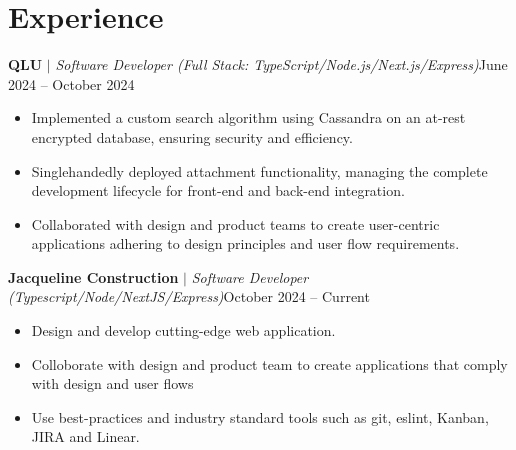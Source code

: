 
\section{Experience}
  \resumeSubHeadingListStart
          \resumeProjectHeading
          {\textbf{QLU}\vspace{8pt} $|$ \footnotesize\emph{Software Developer (Full Stack: TypeScript/Node.js/Next.js/Express)}}{June 2024 -- October 2024}
          \begin{itemize}
            \item Implemented a custom search algorithm using Cassandra on an at-rest encrypted database, ensuring security and efficiency.
            \item Singlehandedly deployed attachment functionality, managing the complete development lifecycle for front-end and back-end integration.
            \item Collaborated with design and product teams to create user-centric applications adhering to design principles and user flow requirements.
          \end{itemize}
          
          \resumeProjectHeading
          {\textbf{Jacqueline Construction}\vspace{8pt} $|$ \footnotesize\emph{Software Developer (Typescript/Node/NextJS/Express)}}{October 2024 -- Current}
            \begin{itemize}
              \item 
              Design and develop cutting-edge web application. 
              \item 
              Colloborate with design and product team to create applications that comply with design and user flows
              \item 
              Use best-practices and industry standard tools such as git, eslint, Kanban, JIRA and Linear. 
          \end{itemize}


    \resumeSubHeadingListEnd